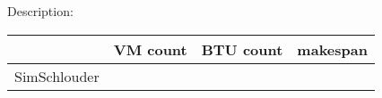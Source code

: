 \documentclass[16pt]{article}
\newlength{\btutikzwidth}
\newlength{\btutikzheight}
\begin{document}
Description: 

\begin{center}
\begin{tabular}{l|rrr}

				& VM count & BTU count & makespan \\
				 \hline
 SimSchlouder &  \\
 \hline
\end{tabular}
\end{center}



\setlength{\pdfpagewidth}{\btutikzwidth}
\setlength{\pdfpageheight}{\btutikzheight}

\addtolength{\pdfpageheight}{5cm}

\hspace*{-3cm}
\begin{tikzpicture}[scale=0.9]

\end{tikzpicture}
 
\end{document}
